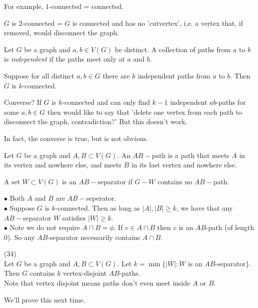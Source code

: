 \documentclass[a4paper]{article}
\begin{document}
For example, $1$-connected = connected.

$G$ is $2$-connected = $G$ is connected and has no 'cutvertex', i.e. a vertex that, if removed, would disconnect the graph.

\begin{defi}
Let $G$ be a graph and $a,b \in V(G)$ be distinct. A collection of paths from $a$ to $b$ is \emph{independent} if the paths meet only at $a$ and $b$.
\end{defi}

Suppose for all distinct $a,b \in G$ there are $k$ independent paths from $a$ to $b$. Then $G$ is $k$-connected.

Converse? If $G$ is $k$-connected and can only find $k-1$ independent $ab$-paths for some $a,b \in G$ then would like to say that 'delete one vertex from each path to disconnect the graph, contradiction?' But this doesn't work.

In fact, the converse is true, but is not obvious.

\begin{defi}
Let $G$ be a graph and $A,B \subset V(G)$. An $AB-$path is a path that meets $A$ in its vertex and nowhere else, and meets $B$ in its last vertex and nowhere else.

A set $W \subset V(G)$ is an $AB-$separator if $G-W$ contains no $AB-$path.
\end{defi}

\begin{rem}
$\bullet$ Both $A$ and $B$ are $AB-$seperator.\\
$\bullet$ Suppose $G$ is $k$-connected. Then as long as $|A|,|B| \geq k$, we have that any $AB-$separator $W$ satisfies $|W| \geq k$.\\
$\bullet$ Note we do not require $A \cap B = \phi$. If $v \in A \cap B$ then $v$ is an $AB$-path (of length $0$). So any $AB$-separator necessarily contains $A \cap B$.
\end{rem}

\begin{thm} (34)\\
Let $G$ be a graph and $A,B \subset V(G)$. Let $k = \min\{|W|:W$ is an $AB$-separator$\}$. Then $G$ contains $k$ vertex-disjoint $AB$-paths.\\
Note that vertex disjoint means paths don't even meet inside $A$ or $B$.

We'll prove this next time.
\end{thm}
\end{document}
